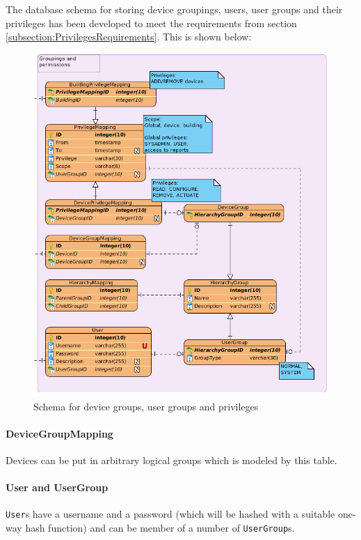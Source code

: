 The database schema for storing device groupings, users, user groups and their privileges has been developed to meet the requirements from section \ref{subsection:PrivilegesRequirements}. This is shown below:

\begin{figure}[H]
    \centering
    \includegraphics[width=\textwidth]{figures/db_user_schema}
    \caption{Schema for device groups, user groups and privileges}
\end{figure}

\paragraph{DeviceGroupMapping}
Devices can be put in arbitrary logical groups which is modeled by this table.

\paragraph{User and UserGroup}
\texttt{User}s have a username and a password (which will be hashed with a suitable one-way hash function) and can be member of a number of \texttt{UserGroup}s.

